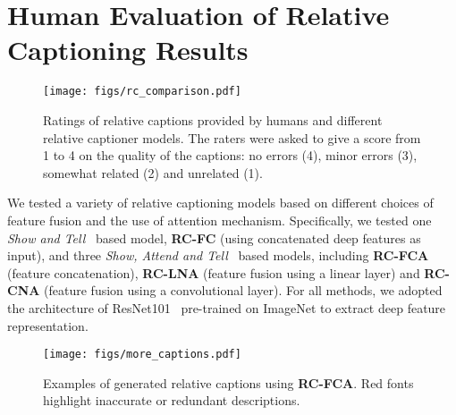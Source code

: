 \section{Human Evaluation of Relative Captioning Results}
\label{sec:app_relative}
\begin{figure}
\begin{center}
\texttt{[image: figs/rc\_comparison.pdf]}
\caption{Ratings of relative captions provided by 
humans and different relative captioner
models. The raters were asked to give a score from 1 to 4 on the
quality of the captions: no errors (4), minor errors (3), 
somewhat related (2) and unrelated (1). }
\label{fig:human}
\end{center}
\end{figure}

We tested a variety of relative captioning models based on different 
choices of feature fusion and the use of attention mechanism. 
Specifically, we tested one
{\em Show and Tell}~\cite{vinyals2015show} based model,
\textbf{RC-FC} (using concatenated deep features as input), 
and three {\em Show, Attend and Tell}~\cite{icml2015_xuc15} based models,
including \textbf{RC-FCA} (feature concatenation), \textbf{RC-LNA} (feature fusion using 
a linear layer) and \textbf{RC-CNA} (feature fusion using a convolutional
layer). For all methods, we adopted the architecture of ResNet101~\cite{He2015}
pre-trained on ImageNet to extract deep feature representation. 

\begin{figure}
\begin{center}
\texttt{[image: figs/more\_captions.pdf]}
\caption{Examples of generated relative captions using \textbf{RC-FCA}. Red fonts highlight
inaccurate or redundant descriptions.}
\label{fig:more_captions}
\end{center}
\end{figure}

